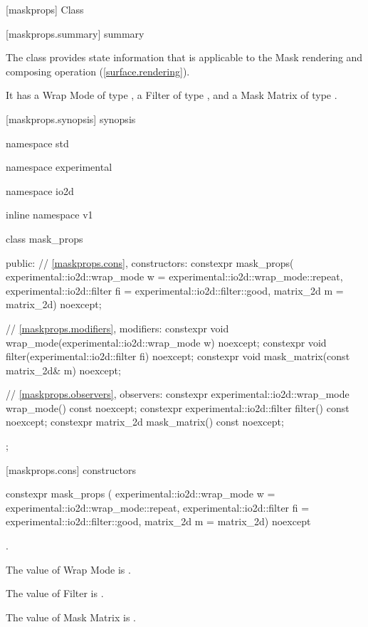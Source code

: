 
 [maskprops] {Class }

 [maskprops.summary] { summary}

\pnum
The  class provides state information that is applicable to the Mask rendering and composing operation (\ref{surface.rendering}).

\pnum
It has a Wrap Mode of type , a Filter of type , and a Mask Matrix of type .

 [maskprops.synopsis] { synopsis}

\begin{codeblock}
namespace std { namespace experimental { namespace io2d { inline namespace v1 {
  class mask_props {
  public:
    // \ref{maskprops.cons}, constructors:
    constexpr mask_props(
      experimental::io2d::wrap_mode w = experimental::io2d::wrap_mode::repeat,
      experimental::io2d::filter fi = experimental::io2d::filter::good,
      matrix_2d m = matrix_2d{}) noexcept;

    // \ref{maskprops.modifiers}, modifiers:
    constexpr void wrap_mode(experimental::io2d::wrap_mode w) noexcept;
    constexpr void filter(experimental::io2d::filter fi) noexcept;
    constexpr void mask_matrix(const matrix_2d& m) noexcept;

    // \ref{maskprops.observers}, observers:
    constexpr experimental::io2d::wrap_mode wrap_mode() const noexcept;
    constexpr experimental::io2d::filter filter() const noexcept;
    constexpr matrix_2d mask_matrix() const noexcept;
  };
}}}}
\end{codeblock}

 [maskprops.cons] { constructors}

\begin{itemdecl}
constexpr mask_props (
  experimental::io2d::wrap_mode w = experimental::io2d::wrap_mode::repeat,
  experimental::io2d::filter fi = experimental::io2d::filter::good,
  matrix_2d m = matrix_2d{}) noexcept    
\end{itemdecl}
\begin{itemdescr}
\onecolumn
\preconditions
{}.

\pnum
\effects
The value of Wrap Mode is .

\pnum
The value of Filter is .

\pnum
The value of Mask Matrix is .
\end{itemdescr}

